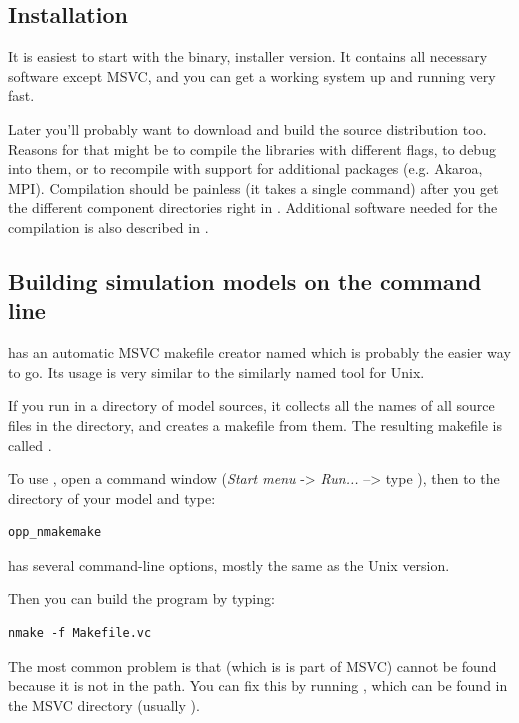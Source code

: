 \subsection{Installation}

It is easiest to start with the binary, installer version.
It contains all necessary software except MSVC,
and you can get a working system up and running very fast.

Later you'll probably want to download and build the source
distribution too. Reasons for that might be to compile the libraries
with different flags, to debug into them, or to recompile
with support for additional packages (e.g. Akaroa, MPI).
Compilation should be painless (it takes a single
 command) after you get the different
component directories right in .
Additional software needed for the compilation is also described
in .


\subsection{Building simulation models on the command line}

{\opp} has an automatic MSVC makefile creator named 
which is probably the easier way to go. Its usage is very similar
to the similarly named tool for Unix.

If you run  in a directory of model sources, it
collects all the names of all source files in the directory,
and creates a makefile from them. The resulting makefile is
called .

To use , open a command window (\textit{Start menu}
-> \textit{Run...} --> type ), then  to the directory
of your model and type:

\begin{verbatim}
opp_nmakemake
\end{verbatim}

 has several command-line options, mostly the
same as the Unix version.

Then you can build the program by typing:

\begin{verbatim}
nmake -f Makefile.vc
\end{verbatim}

The most common problem is that  (which is is part of MSVC)
cannot be found because it is not in the path. You can fix
this by running , which can be found in the
MSVC  directory (usually
).


